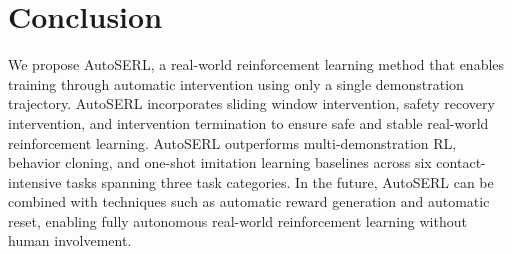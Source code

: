 \documentclass[runningheads]{llncs}
\begin{document}
\section{Conclusion}
We propose AutoSERL, a real-world reinforcement learning method that enables training through automatic intervention using only a single demonstration trajectory. AutoSERL incorporates sliding window intervention, safety recovery intervention, and intervention termination to ensure safe and stable real-world reinforcement learning.
AutoSERL outperforms multi-demonstration RL, behavior cloning, and one-shot imitation learning baselines across six contact-intensive tasks spanning three task categories.
In the future, AutoSERL can be combined with techniques such as automatic reward generation and automatic reset, enabling fully autonomous real-world reinforcement learning without human involvement.




%
%


\end{document}
